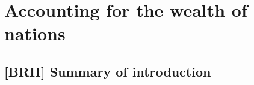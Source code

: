 %
%
%


\chapter{Accounting for the wealth of nations}
\label{chap:acct_for_won}








\section{[BRH] Summary of introduction}
\label{sec:intro_summary}

